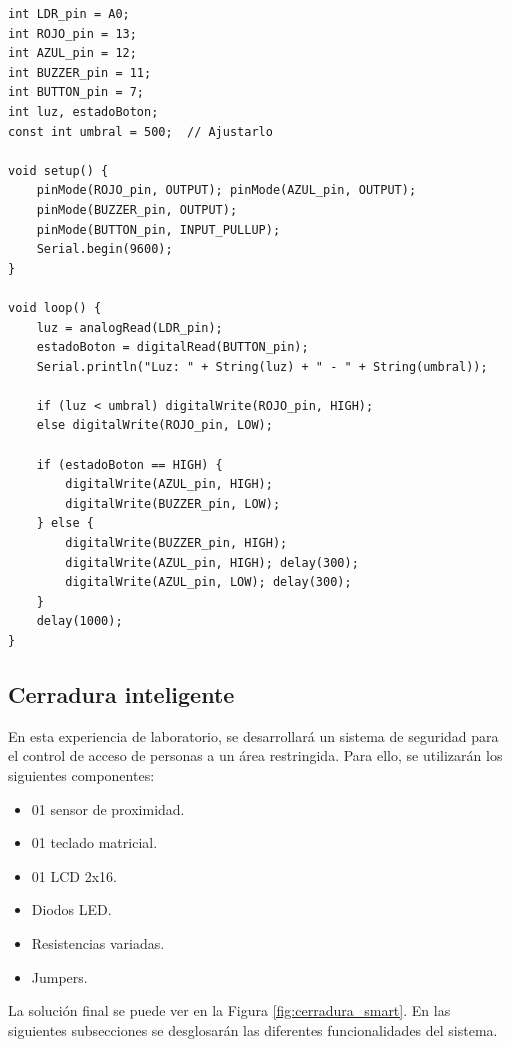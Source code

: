 \documentclass{article}
\begin{document}
\begin{lstlisting}[style=cppstyle, caption={Código en C++ para el sensor ambiental.}, label={code:sensor_ambiental}]
int LDR_pin = A0;
int ROJO_pin = 13;
int AZUL_pin = 12;
int BUZZER_pin = 11;
int BUTTON_pin = 7;
int luz, estadoBoton;
const int umbral = 500;  // Ajustarlo

void setup() {
    pinMode(ROJO_pin, OUTPUT); pinMode(AZUL_pin, OUTPUT);
    pinMode(BUZZER_pin, OUTPUT);
    pinMode(BUTTON_pin, INPUT_PULLUP);
    Serial.begin(9600);
}

void loop() {
    luz = analogRead(LDR_pin);
    estadoBoton = digitalRead(BUTTON_pin);
    Serial.println("Luz: " + String(luz) + " - " + String(umbral));
    
    if (luz < umbral) digitalWrite(ROJO_pin, HIGH);
    else digitalWrite(ROJO_pin, LOW);
    
    if (estadoBoton == HIGH) {
        digitalWrite(AZUL_pin, HIGH);
        digitalWrite(BUZZER_pin, LOW);
    } else {
        digitalWrite(BUZZER_pin, HIGH);
        digitalWrite(AZUL_pin, HIGH); delay(300);
        digitalWrite(AZUL_pin, LOW); delay(300);
    }
    delay(1000);
}    
\end{lstlisting}

\subsection{Cerradura inteligente}

En esta experiencia de laboratorio, se desarrollará un sistema de seguridad para el control de acceso de personas a un área restringida. Para ello, se utilizarán los siguientes componentes: 

\begin{itemize}
    \item 01 sensor de proximidad.
    \item 01 teclado matricial.
    \item 01 LCD 2x16.
    \item Diodos LED.
    \item Resistencias variadas.
    \item Jumpers.
\end{itemize}

La solución final se puede ver en la Figura \ref{fig:cerradura_smart}. En las siguientes subsecciones se desglosarán las diferentes funcionalidades del sistema.
\end{document}
